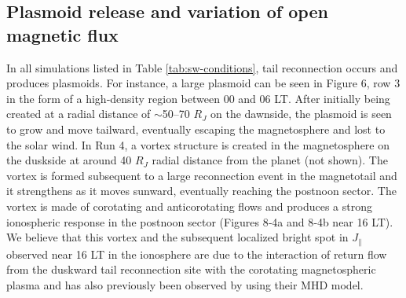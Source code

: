 \subsection{Plasmoid release and variation of open magnetic flux}

In all simulations listed in Table \ref{tab:sw-conditions}, tail reconnection occurs and produces plasmoids. For instance, a large plasmoid can be seen in Figure 6, row 3 in the form of a high‐density region between 00 and 06 LT. After initially being created at a radial distance of $\sim$50–70 $R_J$ on the dawnside, the plasmoid is seen to grow and move tailward, eventually escaping the magnetosphere and lost to the solar wind. In Run 4, a vortex structure is created in the magnetosphere on the duskside at around 40 $R_J$ radial distance from the planet (not shown). The vortex is formed subsequent to a large reconnection event in the magnetotail and it strengthens as it moves sunward, eventually reaching the postnoon sector. The vortex is made of corotating and anticorotating flows and produces a strong ionospheric response in the postnoon sector (Figures 8‐4a and 8‐4b near 16 LT). We believe that this vortex and the subsequent localized bright spot in $J_\parallel$ observed near 16 LT in the ionosphere are due to the interaction of return flow from the duskward tail reconnection site with the corotating magnetospheric plasma and has also previously been observed by \cite{Fukazawa2006a} using their MHD model. 

